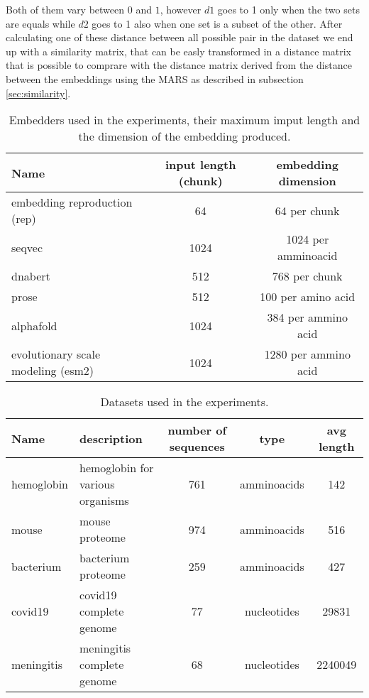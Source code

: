 \documentclass[12pt, letterpaper, twocolumn]{article}
\begin{document}
Both of them vary between $0$ and $1$, however $d1$ goes to 1 only when the two sets are equals while $d2$ goes to 1 also when one set is a subset of the other. After calculating one of these distance between all possible pair in the dataset we end up with a similarity matrix, that can be easly transformed in a distance matrix that is possible to comprare with the distance matrix derived from the distance between the embeddings using the MARS as described in subsection \ref{sec:similarity}.


\onecolumn
\begin{table}[htb]
\centering
\begin{tabular}{|l c c|} 
    \hline
    Name & input length (chunk) & embedding dimension  \\ 
    \hline
    embedding reproduction (rep)\cite{yang2018learned}       & 64    & 64 per chunk   \\
    seqvec \cite{heinzinger2019modeling} & 1024 & 1024 per amminoacid \\
    dnabert \cite{ji2021dnabert}                     & 512     & 768 per chunk \\
    prose   \cite{bepler2021learning}                   & 512   & 100 per amino acid   \\
    alphafold  \cite{jumper2021highly}                 & 1024   & 384 per ammino acid\\
    evolutionary scale modeling (esm2) \cite{lin2022language}   & 1024    & 1280 per ammino acid \\  
    \hline
\end{tabular}
\caption{Embedders used in the experiments, their maximum imput length and the dimension of the embedding produced.}
\label{tab:embedders}
\end{table}
\twocolumn


\onecolumn
\begin{table}[htb]
\centering
\begin{tabular}{|p{3cm} p{3cm} c c c |} 
    \hline
    Name & description & number of sequences & type & avg length   \\ 
    \hline
    hemoglobin &  hemoglobin for various organisms & 761 & amminoacids & 142  \\
    \hline
    mouse & mouse proteome     & 974 & amminoacids & 516 \\
    \hline
    bacterium & bacterium proteome  & 259 &  amminoacids & 427  \\
    \hline
    covid19 & covid19 complete genome & 77 & nucleotides & 29831  \\
    \hline
    meningitis & meningitis complete genome & 68 & nucleotides & 2240049 \\
    \hline
\end{tabular}
\caption{Datasets used in the experiments.}
\label{tab:dataset}
\end{table}
\twocolumn
\end{document}

